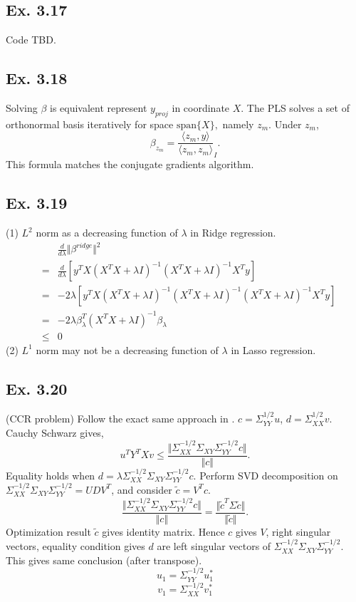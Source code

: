 \subsection*{Ex. 3.17}
Code TBD.

\subsection*{Ex. 3.18}
Solving $\beta$ is equivalent represent $y_{proj}$ in coordinate $X$. The PLS solves a set of orthonormal basis iteratively for space $\mbox{span}\{X\},$ namely $z_{m}.$ Under $z_{m}$,
$$\beta_{z_m}=\frac{\langle z_{m}, y\rangle}{\langle z_{m}, z_{m}\rangle}_{I}.$$
This formula matches the conjugate gradients algorithm.

\subsection*{Ex. 3.19}
(1) $L^2$ norm as a decreasing function of $\lambda$ in Ridge regression.
\begin{eqnarray*}
    &&\frac{d}{d\lambda} \Vert \beta^{ridge}\Vert^2\\
    &=&\frac{d}{d\lambda} [y^TX(X^TX + \lambda I)^{-1}(X^TX + \lambda I)^{-1}X^Ty]\\
    &=&-2\lambda [y^TX(X^TX + \lambda I)^{-1}(X^TX + \lambda I)^{-1}(X^TX + \lambda I)^{-1}X^Ty]\\
    &=&-2\lambda \beta_{\lambda}^T(X^TX + \lambda I)^{-1}\beta_{\lambda} \\
    &\leq& 0
\end{eqnarray*}
(2) $L^1$ norm may not be a decreasing function of $\lambda$ in Lasso regression.

\subsection*{Ex. 3.20}
(CCR problem) Follow the exact same approach in \cite{Wiki_CCR}.
$c = \Sigma_{YY}^{1/2}u$, $d = \Sigma_{XX}^{1/2}v$.
Cauchy Schwarz gives,
$$u^TY^TXv\leq\frac{\Vert \Sigma_{XX}^{-1/2}\Sigma_{XY}\Sigma_{YY}^{-1/2}c \Vert}{\Vert c \Vert}.$$
Equality holds when $d = \lambda \Sigma_{XX}^{-1/2}\Sigma_{XY}\Sigma_{YY}^{-1/2}c.$ Perform SVD decomposition on $ \Sigma_{XX}^{-1/2}\Sigma_{XY}\Sigma_{YY}^{-1/2} = UD V^{T}$, and consider $\tilde{c} = V^T c.$
$$\frac{\Vert \Sigma_{XX}^{-1/2}\Sigma_{XY}\Sigma_{YY}^{-1/2}c \Vert}{\Vert c \Vert}=\frac{\Vert\tilde{c}^T \Sigma \tilde{c}\Vert}{\Vert \tilde{c}\Vert}.$$
Optimization result $\tilde{c}$ gives identity matrix. Hence $c$ gives $V$, right singular vectors, equality condition gives $d$ are left singular vectors of $\Sigma_{XX}^{-1/2}\Sigma_{XY}\Sigma_{YY}^{-1/2}$. This gives same conclusion (after transpose).
$$u_1 = \Sigma_{YY}^{-1/2} u_{1}^*$$
$$v_1 = \Sigma_{XX}^{-1/2} v_{1}^*$$

